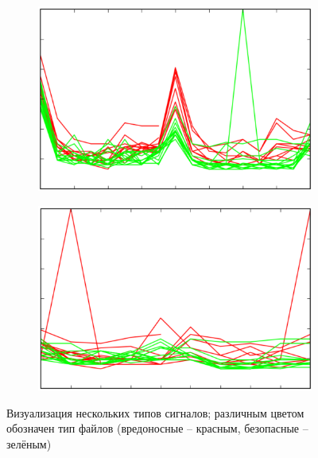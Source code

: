 \begin{figure}[ht]
	\centering
    \begin{subfigure}[b]{0.45\textwidth}
    \centering
        \includegraphics[scale=0.3]{pasted-image-43.png}
        \caption{}
    \end{subfigure}
 	\begin{subfigure}[b]{0.45\textwidth}
    \centering
        \includegraphics[scale=0.3]{pasted-image-45.png}
        \caption{}
    \end{subfigure}
    \caption{Визуализация нескольких типов сигналов; различным цветом обозначен тип файлов (вредоносные -- красным, безопасные -- зелёным)}
    \label{fig_parsetree}
\end{figure}

